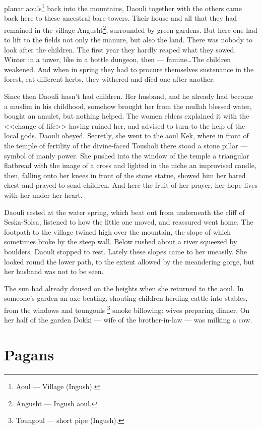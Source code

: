 \documentclass[smalldemyvopaper,11pt,twoside,onecolumn,openright,extrafontsizes]{memoir}
\begin{document}
planar aouls\footnote{Aoul — Village (Ingush).} back into the mountains, Daouli together with the others came back
here to these ancestral bare towers. Their house and all that they had remained
in the village Angusht\footnote{Angusht — Ingush aoul.}, surrounded by green gardens. But here one had to lift
to the fields not only the manure, but also the land. There was nobody to look
after the children. The first year they hardly reaped what they sowed. Winter
in a tower, like in a bottle dungeon, then --- famine\dots The children
weakened. And when in spring they had to procure themselves sustenance in the
forest, eat different herbs, they withered and died one after another.\par
Since then Daouli hasn't had children. Her husband, and he already had become
a muslim in his childhood, somehow brought her from the mullah blessed
water, bought an amulet, but nothing helped. The women elders explained it with
the <<change of life>> having ruined her, and advised to turn to the help of
the local gods. Daouli obeyed. Secretly, she went to the aoul Kek, where in
front of the temple of fertility of the divine-faced Tousholi there stood a
stone pillar --- symbol of manly power. She pushed into the window of the
temple a triangular flatbread with the image of a cross and lighted in the
niche an improvised candle, then, falling onto her knees in front of the stone
statue, showed him her bared chest and prayed to send children. And here the
fruit of her prayer, her hope lives with her under her heart.\par
Daouli rested at the water spring, which beat out from underneath the cliff of
Seska-Solsa, listened to how the little one moved, and reassured went home. The
footpath to the village twined high over the mountain, the slope of which
sometimes broke by the steep wall. Below rushed about a river squeezed by
boulders. Daouli stopped to rest. Lately these slopes came to her uneasily.
She looked round the lower path, to the extent allowed by the meandering gorge,
but her husband was not to be seen.\par
The sun had already doused on the heights when she returned to the aoul. In
someone's garden an axe beating, shouting children herding cattle into stables,
from the windows and toungouls \footnote{Toungoul — short pipe (Ingush).} smoke billowing: wives preparing dinner. On her
half of the garden Dokki --- wife of the brother-in-law --- was milking a cow.


\chapter{Pagans}
\end{document}
